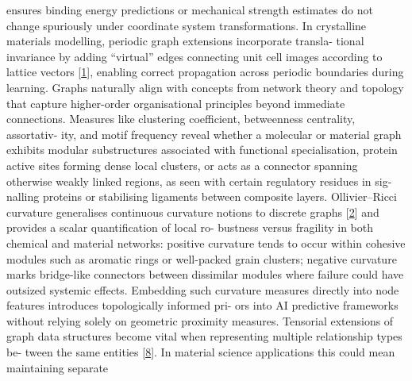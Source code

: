 \documentclass[
]{article}
\begin{document}
ensures binding energy predictions or mechanical strength estimates do
not change spuriously under coordinate system transformations. In
crystalline materials modelling, periodic graph extensions incorporate
transla- tional invariance by adding ``virtual'' edges connecting unit
cell images according to lattice vectors
{[}\protect\hyperlink{_bookmark41}{1}{]}, enabling correct propagation
across periodic boundaries during learning. Graphs naturally align with
concepts from network theory and topology that capture higher-order
organisational principles beyond immediate connections. Measures like
clustering coefficient, betweenness centrality, assortativ- ity, and
motif frequency reveal whether a molecular or material graph exhibits
modular substructures associated with functional specialisation, protein
active sites forming dense local clusters, or acts as a connector
spanning otherwise weakly linked regions, as seen with certain
regulatory residues in sig- nalling proteins or stabilising ligaments
between composite layers. Ollivier--Ricci curvature generalises
continuous curvature notions to discrete graphs
{[}\protect\hyperlink{_bookmark42}{2}{]} and provides a scalar
quantification of local ro- bustness versus fragility in both chemical
and material networks: positive curvature tends to occur within cohesive
modules such as aromatic rings or well-packed grain clusters; negative
curvature marks bridge-like connectors between dissimilar modules where
failure could have outsized systemic effects. Embedding such curvature
measures directly into node features introduces topologically informed
pri- ors into AI predictive frameworks without relying solely on
geometric proximity measures. Tensorial extensions of graph data
structures become vital when representing multiple relationship types
be- tween the same entities {[}\protect\hyperlink{_bookmark48}{8}{]}. In
material science applications this could mean maintaining separate
\end{document}
